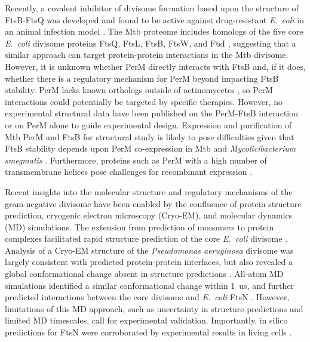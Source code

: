 \documentclass[twocolumn,pdflatex,sn-nature]{sn-jnl}%
\newcommand\ec{\textit{E.~coli}}
\newcommand\mtb{Mtb}
\newcommand\msmegfull{\textit{Mycolicibacterium smegmatis}}
\newcommand\pafull{\textit{Pseudomonas aeruginosa}}
\begin{document}
Recently, a covalent inhibitor of divisome formation based upon the structure of FtsB-FtsQ was developed and found to be active against drug-resistant \ec{} in an animal infection model \citep{paulussenCovalentProteomimeticInhibitor2022}. The \mtb{} proteome includes homologs of the five core \ec{} divisome proteins FtsQ, FtsL, FtsB, FtsW, and FtsI \citep{wuCharacterizationConservedNovel2018}, suggesting that a similar approach can target protein-protein interactions in the \mtb{} divisome. However, it is unknown whether PerM directly interacts with FtsB  \citep{wangPersistentMycobacteriumTuberculosis2019} and, if it does, whether there is a regulatory mechanism for PerM beyond impacting FtsB stability. PerM lacks known orthologs outside of actinomycetes \citep{goodsmithDisruptionTuberculosisMembrane2015}, so PerM interactions could potentially be targeted by specific therapies. However, no experimental structural data have been published on the PerM-FtsB interaction or on PerM alone to guide experimental design. Expression and purification of \mtb{} PerM and FtsB for structural study is likely to pose difficulties given that FtsB stability depends upon PerM co-expression in \mtb{} and \msmegfull{} \citep{wangPersistentMycobacteriumTuberculosis2019}. Furthermore, proteins such as PerM with a high number of transmembrane helices pose challenges for recombinant expression \citep{graveHighthroughputStrategyIdentification2022, korepanovaCloningExpressionMultiple2005}.

Recent insights into the molecular structure and regulatory mechanisms of the gram-negative divisome have been enabled by the confluence of protein structure prediction, cryogenic electron microscopy (Cryo-EM), and molecular dynamics (MD) simulations. The extension from prediction of monomers to protein complexes \citep{baekAccuratePredictionProtein2021, evansProteinComplexPrediction2022} facilitated rapid structure prediction of the core \ec{} divisome \citep{attaibiUpdatedModelDivisome2022, cravenModelInteractionsFtsQLB2022}. Analysis of a Cryo-EM structure of the \pafull{} divisome was largely consistent with predicted protein-protein interfaces, but also revealed a global conformational change absent in structure predictions \citep{kashammerCryoEMStructureBacterial2023}. All-atom MD simulations identified a similar conformational change within \qty{1}{us}, and further predicted interactions between the core divisome and \ec{} FtsN \citep{brittonConformationalChangesEssential2023}. However, limitations of this MD approach, such as uncertainty in structure predictions and limited MD timescales, call for experimental validation. Importantly, in silico predictions for FtsN were corroborated by experimental results in living cells \citep{parkEssentialDomainFtsN2023}.
\end{document}
